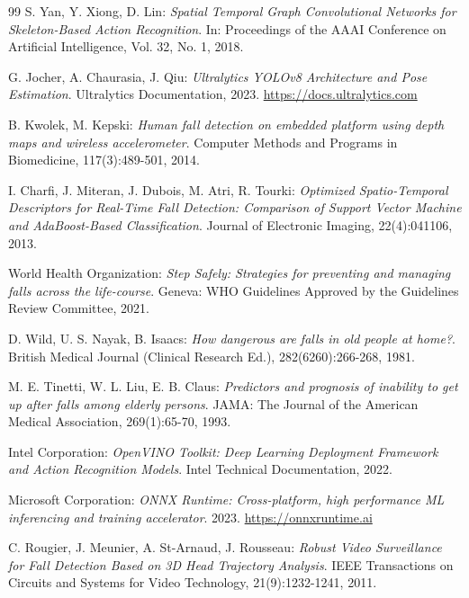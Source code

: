 \documentclass[12pt,a4paper,oneside]{report}
\begin{document}
\begin{thebibliography}{99}
S. Yan, Y. Xiong, D. Lin: \textit{Spatial Temporal Graph Convolutional Networks for Skeleton-Based Action Recognition}. In: Proceedings of the AAAI Conference on Artificial Intelligence, Vol. 32, No. 1, 2018.

G. Jocher, A. Chaurasia, J. Qiu: \textit{Ultralytics YOLOv8 Architecture and Pose Estimation}. Ultralytics Documentation, 2023. \url{https://docs.ultralytics.com}

B. Kwolek, M. Kepski: \textit{Human fall detection on embedded platform using depth maps and wireless accelerometer}. Computer Methods and Programs in Biomedicine, 117(3):489-501, 2014.

I. Charfi, J. Miteran, J. Dubois, M. Atri, R. Tourki: \textit{Optimized Spatio-Temporal Descriptors for Real-Time Fall Detection: Comparison of Support Vector Machine and AdaBoost-Based Classification}. Journal of Electronic Imaging, 22(4):041106, 2013.

World Health Organization: \textit{Step Safely: Strategies for preventing and managing falls across the life-course}. Geneva: WHO Guidelines Approved by the Guidelines Review Committee, 2021.

D. Wild, U. S. Nayak, B. Isaacs: \textit{How dangerous are falls in old people at home?}. British Medical Journal (Clinical Research Ed.), 282(6260):266-268, 1981.

M. E. Tinetti, W. L. Liu, E. B. Claus: \textit{Predictors and prognosis of inability to get up after falls among elderly persons}. JAMA: The Journal of the American Medical Association, 269(1):65-70, 1993.

Intel Corporation: \textit{OpenVINO Toolkit: Deep Learning Deployment Framework and Action Recognition Models}. Intel Technical Documentation, 2022.

Microsoft Corporation: \textit{ONNX Runtime: Cross-platform, high performance ML inferencing and training accelerator}. 2023. \url{https://onnxruntime.ai}

C. Rougier, J. Meunier, A. St-Arnaud, J. Rousseau: \textit{Robust Video Surveillance for Fall Detection Based on 3D Head Trajectory Analysis}. IEEE Transactions on Circuits and Systems for Video Technology, 21(9):1232-1241, 2011.


\end{thebibliography}
\end{document}
